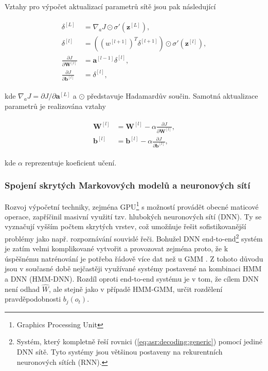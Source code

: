 \noindent Vztahy pro výpočet aktualizací parametrů sítě jsou pak následující

\begin{align}
  \begin{split}
    \delta^{[L]} & = \nabla_{a} J \odot \sigma'\left(\mathbf{z}^{[L]}\right), \\
    \delta^{[l]} & = \left(\left(w^{[l+1]}\right)^T \delta^{[l+1]}\right) \odot \sigma'\left(\mathbf{z}^{[l]}\right), \\
    \frac{\partial J}{\partial \mathbf{W}^{[l]}} & = \mathbf{a}^{[l-1]}\delta^{[l]}, \\
    \frac{\partial J}{\partial \mathbf{b}^{[l]}} & = \delta^{[l]},
  \end{split}
  \label{eq:asr:acoustic:dnn:bp}
\end{align}

\noindent kde $\nabla_a J = \partial J / \partial \mathbf{a}^{[L]}$ a $\odot$ představuje Hadamardův součin. Samotná aktualizace parametrů je realizována vztahy

\begin{align}
  \begin{split}
    \mathbf{W}^{[l]} & = \mathbf{W}^{[l]} - \alpha \frac{\partial J}{\partial \mathbf{W}^{[l]}}, \\
    \mathbf{b}^{[l]} & = \mathbf{b}^{[l]} - \alpha \frac{\partial J}{\partial \mathbf{b}^{[l]}},
  \end{split}
  \label{eq:asr:acoustic:dnn:update}
\end{align}

\noindent kde $\alpha$ reprezentuje koeficient učení.

\subsubsection{Spojení skrytých Markovových modelů a neuronových sítí}

Rozvoj výpočetní techniky, zejména GPU\footnote{Graphics Processing Unit} s možností provádět obecné maticové operace, zapříčinil masivní využití tzv. hlubokých neuronových sítí (DNN). Ty se vyznačují vyšším počtem skrytých vrstev, což umožňuje řešit sofistikovanější problémy jako např. rozpoznávání souvislé řeči. Bohužel DNN end-to-end\footnote{Systém, který kompletně řeší rovnici (\ref{eq:asr:decoding:generic}) pomocí jediné DNN sítě. Tyto systémy jsou většinou postaveny na rekurentních neuronových sítích (RNN).} systém je zatím velmi komplikované vytvořit a provozovat zejména proto, že k úspěšnému natrénování je potřeba řádově více dat než u GMM \cite{Amodei2016}. Z tohoto důvodu jsou v současné době nejčastěji využívané systémy postavené na kombinaci HMM a DNN (HMM-DNN). Rozdíl oproti end-to-end systému je v tom, že cílem DNN není odhad $\hat{W}$, ale stejně jako v případě HMM-GMM, určit rozdělení pravděpodobnosti $b_j\left(o_t\right)$.

